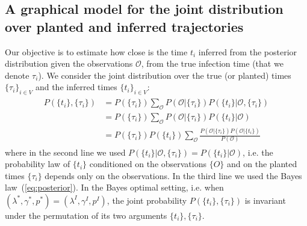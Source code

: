 \documentclass[a4paper, amsfonts, amssymb, amsmath, reprint, showkeys, nofootinbib, twoside, floatfix, pre,superscriptaddress]{revtex4-2}
\begin{document}
\subsection{A graphical model for the joint distribution over planted and inferred trajectories}
Our objective is to estimate how close is the time $t_i$ inferred from the posterior distribution given the observations $\mathcal{O}$, from the true infection time (that we denote $\tau_i$). 
We consider the joint distribution over the true (or planted) times $\{\tau_i\}_{i\in V}$ and the inferred times $\{t_i\}_{i\in V}$:
\begin{align}
\label{eq:joint}
\begin{aligned}
	P(\{t_i\}, \{\tau_i\}) &= P(\{\tau_i\})\sum_{\mathcal{O}}P(\mathcal{O}|\{\tau_i\})P(\{t_i\}|\mathcal{O},\{\tau_i\})\\
	&= P(\{\tau_i\})\sum_{\mathcal{O}}P(\mathcal{O}|\{\tau_i\})P(\{t_i\}|\mathcal{O})\\
	&=P(\{\tau_i\})P(\{t_i\})\sum_{\mathcal{O}}\frac{P(\mathcal{O}|\{\tau_i\})P(\mathcal{O}|\{t_i\})}{P(\mathcal{O})}
\end{aligned}
\end{align}
where in the second line we used $P(\{t_i\}|\mathcal{O},\{\tau_i\})=P(\{t_i\}|\mathcal{O})$, i.e. the probability law of $\{t_i\}$ conditioned on the observations $\{O\}$ and on the planted times $\{\tau_i\}$ depends only on the observations. In the third line we used the Bayes law~(\ref{eq:posterior}).
In the Bayes optimal setting, i.e. when $(\lambda^*, \gamma^*, p^*)=(\lambda^I, \gamma^I, p^I)$, the joint probability $P(\{t_i\}, \{\tau_i\})$ is invariant under the permutation of its two arguments $\{t_i\}, \{\tau_i\}$.
\end{document}
